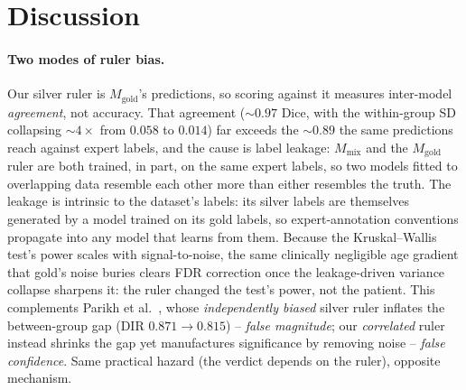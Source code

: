 \section{Discussion}
\label{sec:discussion}

\paragraph{Two modes of ruler bias.}
Our silver ruler is $M_{\mathrm{gold}}$'s predictions, so scoring against it measures
inter-model \emph{agreement}, not accuracy. That agreement (${\sim}0.97$ Dice, with
the within-group SD collapsing ${\sim}4\times$ from $0.058$ to $0.014$) far exceeds
the ${\sim}0.89$ the same predictions reach against expert labels, and the cause is
label leakage: $M_{\mathrm{mix}}$ and the $M_{\mathrm{gold}}$ ruler are both trained,
in part, on the same expert labels, so two models fitted to overlapping data resemble
each other more than either resembles the truth. The leakage is intrinsic to the
dataset's labels: its silver labels are themselves generated by a model trained on its
gold labels, so expert-annotation conventions propagate into any model that learns from
them. Because the Kruskal--Wallis
test's power scales with signal-to-noise, the same clinically negligible age gradient
that gold's noise buries clears FDR correction once the leakage-driven variance
collapse sharpens it: the ruler changed the test's power, not the patient. This
complements Parikh et al.~\cite{parikh2025labelbias}, whose \emph{independently
biased} silver ruler inflates the between-group gap (DIR $0.871 \to 0.815$) --
\emph{false magnitude}; our \emph{correlated} ruler instead shrinks the gap yet
manufactures significance by removing noise -- \emph{false confidence}. Same
practical hazard (the verdict depends on the ruler), opposite mechanism.

